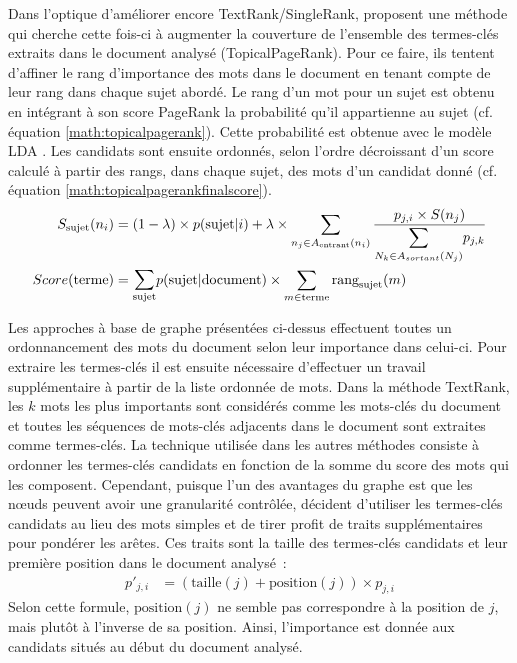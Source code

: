           Dans l'optique d'améliorer encore TextRank/SingleRank,
          \citet{liu2010topicalpagerank} proposent une méthode qui cherche cette
          fois-ci à augmenter la couverture de l'ensemble des termes-clés
          extraits dans le document analysé (TopicalPageRank). Pour ce faire,
          ils tentent d'affiner le rang d'importance des mots dans le document
          en tenant compte de leur rang dans chaque sujet abordé. Le rang d'un
          mot pour un sujet est obtenu en intégrant à son score PageRank la
          probabilité qu'il appartienne au sujet (cf. équation
          \ref{math:topicalpagerank}). Cette probabilité est obtenue avec le
          modèle LDA \citep{blei2003lda}. Les candidats sont ensuite ordonnés,
          selon l'ordre décroissant d'un score calculé à partir des rangs, dans
          chaque sujet, des mots d'un candidat donné (cf. équation
          \ref{math:topicalpagerankfinalscore}).
          \begin{align}
            S_{\text{sujet}}(n_i) &= (1 - \lambda) \times p(\text{sujet} | i) + \lambda \times \sum_{n_j \in A_{\text{entrant}}(n_i)} \frac{p_{j, i} \times S(n_j)}{\mathlarger{\sum}_{N_k \in A_{sortant}(N_j)} p_{j, k}} \label{math:topicalpagerank}\\
            Score(\text{terme}) &= \mathlarger{\sum}_{\text{sujet}} p(\text{sujet} | \text{document}) \times \sum_{m \in \text{terme}} \text{rang}_{\text{sujet}}(m) \label{math:topicalpagerankfinalscore}
          \end{align}

          Les approches à base de graphe présentées ci-dessus effectuent toutes
          un ordonnancement des mots du document selon leur importance dans
          celui-ci. Pour extraire les termes-clés il est ensuite nécessaire
          d'effectuer un travail supplémentaire à partir de la liste ordonnée de
          mots. Dans la méthode TextRank, les $k$ mots les plus importants sont
          considérés comme les mots-clés du document et toutes les séquences de
          mots-clés adjacents dans le document sont extraites comme termes-clés.
          La technique utilisée dans les autres méthodes consiste à ordonner les
          termes-clés candidats en fonction de la somme du score des mots qui
          les composent. Cependant, puisque l'un des avantages du graphe est que
          les n\oe{}uds peuvent avoir une granularité contrôlée,
          \citet{liang2009querylog} décident d'utiliser les termes-clés
          candidats au lieu des mots simples et de tirer profit de traits
          supplémentaires pour pondérer les arêtes. Ces traits sont la taille
          des termes-clés candidats et leur première position dans le document
          analysé~:
          \begin{align}
            p'_{j, i} &= (\text{taille}(j) + \text{position}(j)) \times p_{j, i}
          \end{align}
          Selon cette formule, $\text{position}(j)$ ne semble pas correspondre à
          la position de $j$, mais plutôt à l'inverse de sa position. Ainsi,
          l'importance est donnée aux candidats situés au début du document
          analysé.

